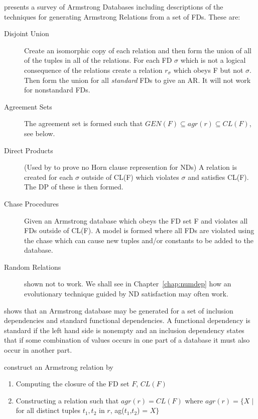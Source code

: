 \medskip

\cite{fag82} presents a survey of Armstrong Databases  including
descriptions of the techniques for generating Armstrong Relations from
a set of FDs.  
These are:
\begin{description}
\item[Disjoint Union] Create an isomorphic copy of each relation and
then form the union of all of the tuples in all of the relations. For
each FD $\sigma$ which is not a logical consequence of the relations create
a relation $r_\sigma$ which obeys F but not $\sigma$. Then form the union
for all {\em standard} FDs to give an AR. It will not work for nonstandard
FDs.
\item[Agreement Sets] The agreement set is formed such that
$GEN(F) \subseteq agr(r) \subseteq CL(F)$, see below.
\item[Direct Products] (Used by \cite{gm85a} to prove no Horn clause
represention for NDs) A relation is created for each $\sigma$ outside
of CL(F) which violates $\sigma$ and satisfies CL(F). The DP of these
is then formed.
\item[Chase Procedures] Given an Armstrong database which obeys the FD set
F and violates all FDs outside of CL(F). A model is formed where all
FDs are violated using the chase which can cause new tuples and/or
constants to be added to the database.
\item[Random Relations] shown not to work. We shall see in
Chapter~\ref{chap:numdep} how an evolutionary technique guided by ND
satisfaction may often work.
\end{description}

\medskip

\cite{fv83} shows that an Armstrong database may be generated for a set of inclusion 
dependencies and standard functional dependencies.  A functional dependency is
standard if the left hand side is nonempty and an inclusion dependency
states that if some combination of values occurs in one part of a
database it  must also occur in another part. 

\cite{bdfs84} construct an Armstrong relation by
\begin{enumerate}
\item Computing the closure of the FD set $F$, $CL(F)$
\item Constructing a relation such that $agr(r) = CL(F)$ where
\newline
$agr(r) = \{ X \mid $ for all distinct tuples $t_1,t_2$ in $r$,
ag($t_1$,$t_2$) =  $X \}$
\end{enumerate}

